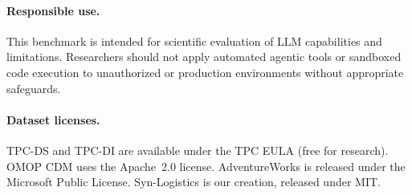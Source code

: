 \paragraph{Responsible use.}
This benchmark is intended for scientific evaluation of LLM capabilities
and limitations.  Researchers should not apply automated agentic tools
or sandboxed code execution to unauthorized or production environments
without appropriate safeguards.

\paragraph{Dataset licenses.}
TPC-DS and TPC-DI are available under the TPC EULA (free for research).
OMOP CDM uses the Apache~2.0 license. AdventureWorks is released under
the Microsoft Public License. Syn-Logistics is our creation, released
under MIT.
